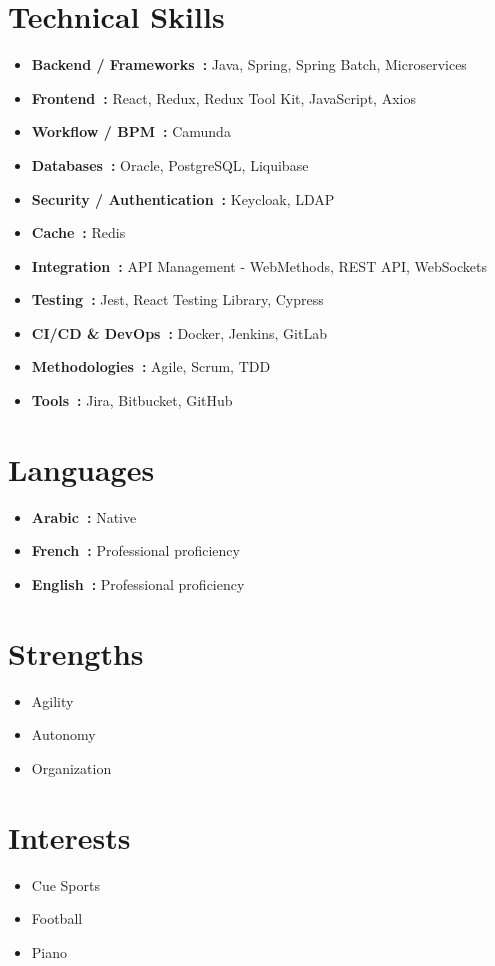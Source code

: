 \section*{Technical Skills}

\begin{itemize}
    \item \textbf{Backend / Frameworks~:} Java, Spring, Spring Batch, Microservices
    \item \textbf{Frontend~:} React, Redux, Redux Tool Kit, JavaScript, Axios
    \item \textbf{Workflow / BPM~:} Camunda
    \item \textbf{Databases~:} Oracle, PostgreSQL, Liquibase
    \item \textbf{Security / Authentication~:} Keycloak, LDAP
    \item \textbf{Cache~:} Redis
    \item \textbf{Integration~:} API Management - WebMethods, REST API, WebSockets
    \item \textbf{Testing~:} Jest, React Testing Library, Cypress
    \item \textbf{CI/CD \& DevOps~:} Docker, Jenkins, GitLab
    \item \textbf{Methodologies~:} Agile, Scrum, TDD
    \item \textbf{Tools~:} Jira, Bitbucket, GitHub
\end{itemize}

\section*{Languages}

\begin{itemize}
    \item \textbf{Arabic~:} Native
    \item \textbf{French~:} Professional proficiency
    \item \textbf{English~:} Professional proficiency
\end{itemize}

\section*{Strengths}

\begin{itemize}
    \item Agility
    \item Autonomy
    \item Organization
\end{itemize}

\section*{Interests}

\begin{itemize}
    \item Cue Sports
    \item Football
    \item Piano
\end{itemize}
